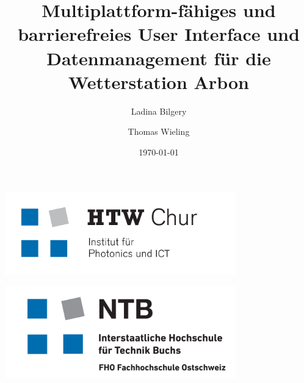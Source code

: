 \begin{titlepage}


\begin{minipage}[t]{0.5\textwidth}
	\begin{flushleft}
		\vspace{0pt}
		\includegraphics[width=0.75\textwidth]{img/logo_htw.png}
	\end{flushleft}
\end{minipage}
\begin{minipage}[t]{0.5\textwidth}
	\begin{flushright}
		\vspace{0pt}
		\vspace{3.5mm}
		\includegraphics[width=0.75\textwidth]{img/logo_ntb.png}
	\end{flushright}
\end{minipage}
%
\begin{center}
%
\title{Multiplattform-fähiges und barrierefreies User Interface und Datenmanagement für die Wetterstation Arbon}
\author{Ladina Bilgery \and Thomas Wieling}
\date{\today}



\end{center}
\end{titlepage}
